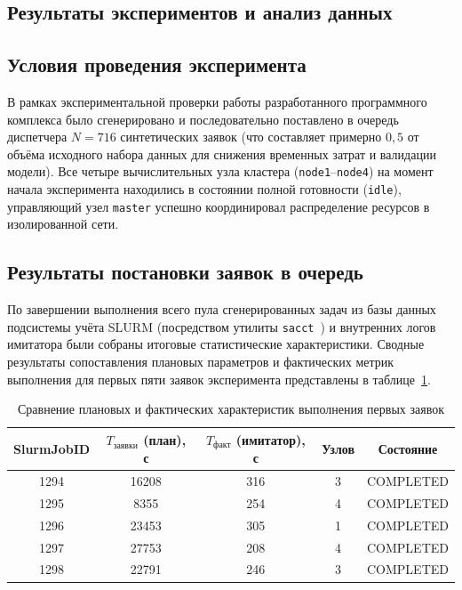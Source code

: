\subsection{Результаты экспериментов и анализ данных}

\subsection*{Условия проведения эксперимента}

В рамках экспериментальной проверки работы разработанного программного
комплекса было сгенерировано и последовательно поставлено в очередь
диспетчера $N = 716$ синтетических заявок (что составляет примерно
$0{,}5$ от объёма исходного набора данных для снижения временных затрат
и валидации модели). Все четыре вычислительных узла кластера
(\texttt{node1}--\texttt{node4}) на момент начала эксперимента находились
в состоянии полной готовности (\texttt{idle}), управляющий узел
\texttt{master} успешно координировал распределение ресурсов в
изолированной сети.

\subsection*{Результаты постановки заявок в очередь}

По завершении выполнения всего пула сгенерированных задач из базы данных
подсистемы учёта SLURM (посредством утилиты
\texttt{sacct}~\cite{schedmd2024sacct}) и внутренних логов имитатора были
собраны итоговые статистические характеристики. Сводные результаты
сопоставления плановых параметров и фактических метрик выполнения для
первых пяти заявок эксперимента представлены в таблице~\ref{tab:results}.

\begin{table}[H]
\caption{Сравнение плановых и фактических характеристик выполнения первых заявок}
\label{tab:results}
\centering
\begin{tabular}{|c|c|c|c|c|}
\hline
SlurmJobID & $T_{\text{заявки}}$ (план), с & $T_{\text{факт}}$ (имитатор), с & Узлов & Состояние \\
\hline
1294 & 16208 & 316 & 3 & COMPLETED \\
1295 & 8355  & 254 & 4 & COMPLETED \\
1296 & 23453 & 305 & 1 & COMPLETED \\
1297 & 27753 & 208 & 4 & COMPLETED \\
1298 & 22791 & 246 & 3 & COMPLETED \\
\hline
\end{tabular}
\end{table}


